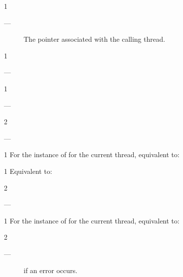 \documentclass[fontsize=10pt,paper=A4,pagesize,DIV=15]{scrartcl}
\begin{document}
1 \returns
\begin{description}
    \item[---] The pointer associated with the calling thread.
\end{description}


1 \returns
\begin{description}
    \item[---] 
\end{description}


1 \precond
\begin{description}
    \item[---] 
\end{description}

2 \returns
\begin{description}
    \item[---] 
\end{description}


1 \effects
For the instance of  for the current thread, equivalent to:


1 \effects
Equivalent to: 

2 \postcond
\begin{description}
    \item[---] 
\end{description}


1 \effects
For the instance of  for the current thread, equivalent to:

2 \except
\begin{description}
    \item[---]  if an error occurs.
\end{description}
\end{document}
